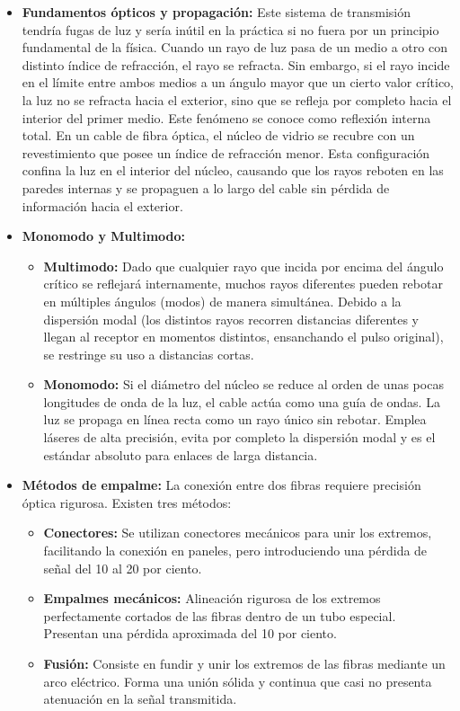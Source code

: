 \begin{itemize}
    \item \textbf{Fundamentos ópticos y propagación:} Este sistema de transmisión tendría fugas de luz y sería inútil en la práctica si no fuera por un principio fundamental de la física. Cuando un rayo de luz pasa de un medio a otro con distinto índice de refracción, el rayo se refracta. Sin embargo, si el rayo incide en el límite entre ambos medios a un ángulo mayor que un cierto valor crítico, la luz no se refracta hacia el exterior, sino que se refleja por completo hacia el interior del primer medio. Este fenómeno se conoce como reflexión interna total. En un cable de fibra óptica, el núcleo de vidrio se recubre con un revestimiento que posee un índice de refracción menor. Esta configuración confina la luz en el interior del núcleo, causando que los rayos reboten en las paredes internas y se propaguen a lo largo del cable sin pérdida de información hacia el exterior.
    
    \item \textbf{Monomodo y Multimodo:}
    \begin{itemize}
        \item \textbf{Multimodo:} Dado que cualquier rayo que incida por encima del ángulo crítico se reflejará internamente, muchos rayos diferentes pueden rebotar en múltiples ángulos (modos) de manera simultánea. Debido a la dispersión modal (los distintos rayos recorren distancias diferentes y llegan al receptor en momentos distintos, ensanchando el pulso original), se restringe su uso a distancias cortas.
        \item \textbf{Monomodo:} Si el diámetro del núcleo se reduce al orden de unas pocas longitudes de onda de la luz, el cable actúa como una guía de ondas. La luz se propaga en línea recta como un rayo único sin rebotar. Emplea láseres de alta precisión, evita por completo la dispersión modal y es el estándar absoluto para enlaces de larga distancia.
    \end{itemize}
    
    \item \textbf{Métodos de empalme:} La conexión entre dos fibras requiere precisión óptica rigurosa. Existen tres métodos:
    \begin{itemize}
        \item \textbf{Conectores:} Se utilizan conectores mecánicos para unir los extremos, facilitando la conexión en paneles, pero introduciendo una pérdida de señal del 10 al 20 por ciento.
        \item \textbf{Empalmes mecánicos:} Alineación rigurosa de los extremos perfectamente cortados de las fibras dentro de un tubo especial. Presentan una pérdida aproximada del 10 por ciento.
        \item \textbf{Fusión:} Consiste en fundir y unir los extremos de las fibras mediante un arco eléctrico. Forma una unión sólida y continua que casi no presenta atenuación en la señal transmitida.
    \end{itemize}
\end{itemize}

